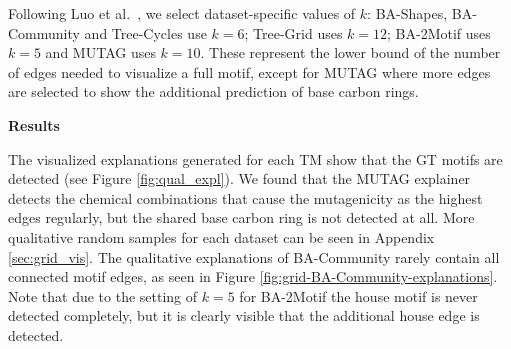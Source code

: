 Following Luo et al.~\cite{luo2020parameterized}, we select dataset-specific values of $k$: BA-Shapes, BA-Community and Tree-Cycles use $k=6$; Tree-Grid uses $k=12$; BA-2Motif uses $k=5$ and MUTAG uses $k=10$. These represent the lower bound of the number of edges needed to visualize a full motif, except for MUTAG where more edges are selected to show the additional prediction of base carbon rings. \bigskip

\textbf{Results}\par
The visualized explanations generated for each \ac{TM} show that the \ac{GT} motifs are detected (see Figure \ref{fig:qual_expl}).
We found that the MUTAG explainer detects the chemical combinations that cause the mutagenicity as the highest edges regularly, but the shared base carbon ring is not detected at all. More qualitative random samples for each dataset can be seen in Appendix \ref{sec:grid_vis}. The qualitative explanations of BA-Community rarely contain all connected motif edges, as seen in Figure \ref{fig:grid-BA-Community-explanations}. Note that due to the setting of $k=5$ for BA-2Motif the house motif is never detected completely, but it is clearly visible that the additional house edge is detected.

